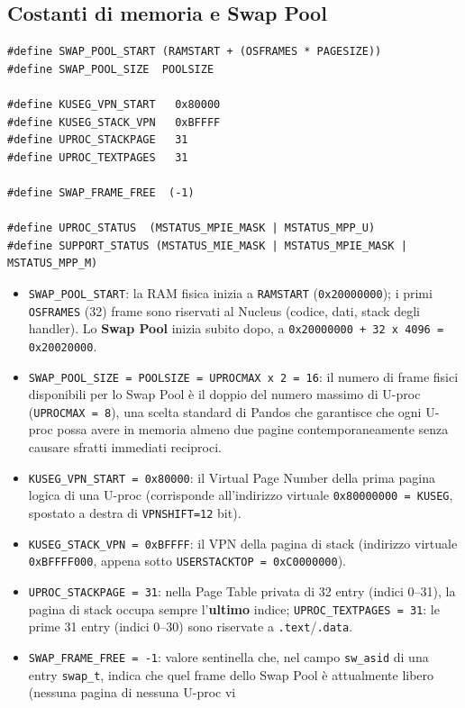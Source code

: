 \documentclass[11pt,a4paper]{article}
\newcommand{\code}[1]{\texttt{#1}}
\begin{document}
\subsection{Costanti di memoria e Swap Pool}
\begin{lstlisting}
#define SWAP_POOL_START (RAMSTART + (OSFRAMES * PAGESIZE))
#define SWAP_POOL_SIZE  POOLSIZE

#define KUSEG_VPN_START   0x80000
#define KUSEG_STACK_VPN   0xBFFFF
#define UPROC_STACKPAGE   31
#define UPROC_TEXTPAGES   31

#define SWAP_FRAME_FREE  (-1)

#define UPROC_STATUS  (MSTATUS_MPIE_MASK | MSTATUS_MPP_U)
#define SUPPORT_STATUS (MSTATUS_MIE_MASK | MSTATUS_MPIE_MASK | MSTATUS_MPP_M)
\end{lstlisting}
\begin{itemize}
\item \code{SWAP\_POOL\_START}: la RAM fisica inizia a \code{RAMSTART}
  (\code{0x20000000}); i primi \code{OSFRAMES} (32) frame sono riservati al
  Nucleus (codice, dati, stack degli handler). Lo \textbf{Swap Pool} inizia
  subito dopo, a \code{0x20000000 + 32 x 4096 = 0x20020000}.
\item \code{SWAP\_POOL\_SIZE = POOLSIZE = UPROCMAX x 2 = 16}: il numero
  di frame fisici disponibili per lo Swap Pool è il doppio del numero
  massimo di U-proc (\code{UPROCMAX = 8}), una scelta standard di Pandos
  che garantisce che ogni U-proc possa avere in memoria almeno due pagine
  contemporaneamente senza causare sfratti immediati reciproci.
\item \code{KUSEG\_VPN\_START = 0x80000}: il Virtual Page Number della
  prima pagina logica di una U-proc (corrisponde all'indirizzo virtuale
  \code{0x80000000 = KUSEG}, spostato a destra di \code{VPNSHIFT=12} bit).
\item \code{KUSEG\_STACK\_VPN = 0xBFFFF}: il VPN della pagina di stack
  (indirizzo virtuale \code{0xBFFFF000}, appena sotto
  \code{USERSTACKTOP = 0xC0000000}).
\item \code{UPROC\_STACKPAGE = 31}: nella Page Table privata di 32 entry
  (indici 0--31), la pagina di stack occupa sempre l'\textbf{ultimo}
  indice; \code{UPROC\_TEXTPAGES = 31}: le prime 31 entry (indici 0--30)
  sono riservate a \code{.text}/\code{.data}.
\item \code{SWAP\_FRAME\_FREE = -1}: valore sentinella che, nel campo
  \code{sw\_asid} di una entry \code{swap\_t}, indica che quel frame dello
  Swap Pool è attualmente libero (nessuna pagina di nessuna U-proc vi

\end{itemize}
\end{document}
